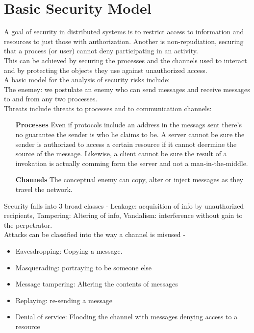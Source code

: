\section{Basic Security Model}
A goal of security in distributed systems is to restrict access to information and resources to just those with authorization. Another is non-repudiation, securing that a process (or user) cannot deny participating in an activity. \\

This can be achieved by securing the processes and the channels used to interact and by protecting the objects they use against unauthorized access.\\

A basic model for the analysis of security risks include: \\

The enemey: we postulate an enemy who can send messages and receive messages 
to and from any two processes. \\

Threats include threats to processes and to communication channels: \\

\begin{itemize}
\item[\textbf{Processes}] Even if protocols include an address in the messags sent there's no guarantee the sender is who he claims to be. A server cannot be sure the sender is authorized to access a certain resource if it cannot deermine the source of the message. Likewise, a client cannot be sure the result of a invokation is actually comming form the server and not a man-in-the-middle.  
\item[\textbf{Channels}] The conceptual enemy can copy, alter or inject messages as they travel the network.
\end{itemize}

Security falls into 3 broad classes - Leakage: acquisition of info by unauthorized recipients, Tampering: Altering of info, Vandalism: interference without gain to the perpetrator.\\

Attacks can be classified into the way a channel is misused -
\begin{itemize}
\item Eavesdropping: Copying a message. 
\item Masquerading: portraying to be someone else
\item Message tampering: Altering the contents of messages
\item Replaying: re-sending a message
\item Denial of service: Flooding the channel with messages denying access to a resource
\end{itemize}

